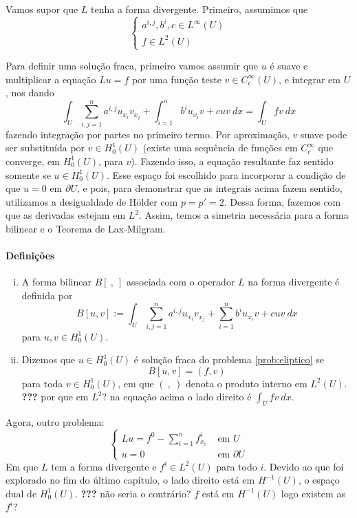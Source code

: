 \documentclass[a4paper, 11pt]{book}
\newcommand{\pu}{\partial U}
\begin{document}
Vamos supor que $L$ tenha a forma divergente. Primeiro, assumimos que \[
\begin{cases}
	a^{i,j}, b^i, c \in L^\infty(U) \\
	f \in L^2(U)
\end{cases}	
\]

Para definir uma solução fraca, primeiro vamos assumir que $u$ é suave e multiplicar a equação $Lu=f$ por uma função teste $v \in C^\infty_c(U)$, e integrar em $U$, nos dando
\[
\int_U \sum_{i,j=1}^n a^{i,j} u_{x_i} v_{x_j} + \int_{i=1}^n b^i u_{x_i} v + cuv\ dx = \int_U fv \ dx 	
\]
fazendo integração por partes no primeiro termo. Por aproximação, $v$ suave pode ser substituída por $v \in H^1_0(U)$ (existe uma sequência de funções em $C^\infty_c$ que converge, em $H^1_0(U)$, para $v$). Fazendo isso, a equação resultante faz sentido somente se $u \in H^1_0(U)$. Esse espaço foi escolhido para incorporar a condição de que $u=0$ em $\pu$, e pois, para demonstrar que as integrais acima fazem sentido, utilizamos a desigualdade de Hölder com $p=p'=2$. Dessa forma, fazemos com que as derivadas estejam em $L^2$. Assim, temos a simetria necessária para a forma bilinear e o Teorema de Lax-Milgram.

\paragraph{Definições}
\begin{enumerate}[(i)]
	\item A forma bilinear $B[\ {,} \ ]$ associada com o operador $L$ na forma divergente é definida por \[
	B[u,v] := \int_U \sum_{i,j=1}^{n} a^{i,j} u_{x_i} v_{x_j} + \sum_{i=1}^{n}b^i u_{x_i}v + cuv \ dx	
	\] para $u,v \in H^1_0(U)$.

	\item Dizemos que $u \in H^1_0(U)$ é solução fraca do problema \eqref{prob:eliptico} se \[
	B[u,v] = (f,v)
	\] para toda $v \in H^1_0(U)$, em que $(\ {,} \ )$ denota o produto interno em $L^2(U)$. \textbf{???} por que em $L^2$? na equação acima o lado direito é $\int_U fv \ dx$.
\end{enumerate}

Agora, outro problema: 
\begin{equation}\label{prob:eliptico-h10}
	\begin{cases}
		Lu=f^0 - \sum_{i=1}^{n}f_{x_i}^i & \text{ em } U \\
		u=0 & \text{ em } \partial U
	\end{cases}
\end{equation}
Em que $L$ tem a forma divergente e $f^i \in L^2(U)$ para todo $i$. Devido ao que foi explorado no fim do último capítulo, o lado direito está em $H^{-1}(U)$, o espaço dual de $H^1_0(U)$. \textbf{???} não seria o contrário? $f$ está em $H^{-1}(U)$ logo existem as $f^i$?
\end{document}
